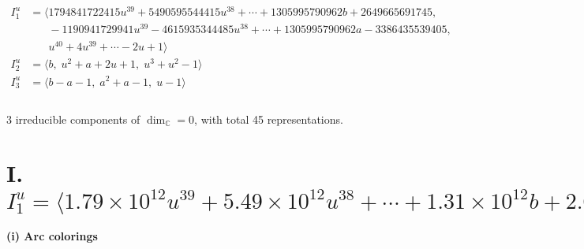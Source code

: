 \documentclass[1p]{elsarticle_modified}
\theoremstyle{definition}
\begin{document}
\begin{align*}
I^u_{1}&=\langle 
1794841722415 u^{39}+5490595544415 u^{38}+\cdots+1305995790962 b+2649665691745,\\
\phantom{I^u_{1}}&\phantom{= \langle  }-1190941729941 u^{39}-4615935344485 u^{38}+\cdots+1305995790962 a-3386435539405,\\
\phantom{I^u_{1}}&\phantom{= \langle  }u^{40}+4 u^{39}+\cdots-2 u+1\rangle \\
I^u_{2}&=\langle 
b,\;u^2+a+2 u+1,\;u^3+u^2-1\rangle \\
I^u_{3}&=\langle 
b- a-1,\;a^2+a-1,\;u-1\rangle \\
\\
\end{align*}
\raggedright * 3 irreducible components of $\dim_{\mathbb{C}}=0$, with total 45 representations.\\
\newpage
\renewcommand{\arraystretch}{1}
\centering \section*{I. $I^u_{1}= \langle 1.79\times10^{12} u^{39}+5.49\times10^{12} u^{38}+\cdots+1.31\times10^{12} b+2.65\times10^{12},\;-1.19\times10^{12} u^{39}-4.62\times10^{12} u^{38}+\cdots+1.31\times10^{12} a-3.39\times10^{12},\;u^{40}+4 u^{39}+\cdots-2 u+1 \rangle$}
\flushleft \textbf{(i) Arc colorings}\\
\end{document}

